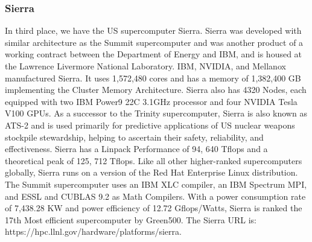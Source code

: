 \documentclass{article}
\begin{document}
\subsubsection{Sierra}
In third place, we have the US supercomputer Sierra. Sierra was developed with similar architecture as the Summit supercomputer and was another product of a working contract between the Department of Energy and IBM, and is housed at the Lawrence Livermore National Laboratory. IBM, NVIDIA, and Mellanox manufactured Sierra. It uses 1,572,480 cores and has a memory of 1,382,400 GB implementing the Cluster Memory Architecture. Sierra also has 4320 Nodes, each equipped with two IBM Power9 22C 3.1GHz processor and four NVIDIA Tesla V100 GPUs. As a successor to the Trinity supercomputer, Sierra is also known as ATS-2 and is used primarily for predictive applications of US nuclear weapons stockpile stewardship, helping to ascertain their safety, reliability, and effectiveness. Sierra has a Linpack Performance of 94, 640 Tflops and a theoretical peak of 125, 712 Tflops. Like all other higher-ranked supercomputers globally, Sierra runs on a version of the Red Hat Enterprise Linux distribution. The Summit supercomputer uses an IBM XLC compiler, an IBM Spectrum MPI, and ESSL and CUBLAS 9.2 as Math Compilers. With a power consumption rate of 7,438.28 KW and power efficiency of 12.72 Gflops/Watts, Sierra is ranked the 17th Most efficient supercomputer by Green500. The Sierra URL is: https://hpc.llnl.gov/hardware/platforms/sierra. 
\end{document}
